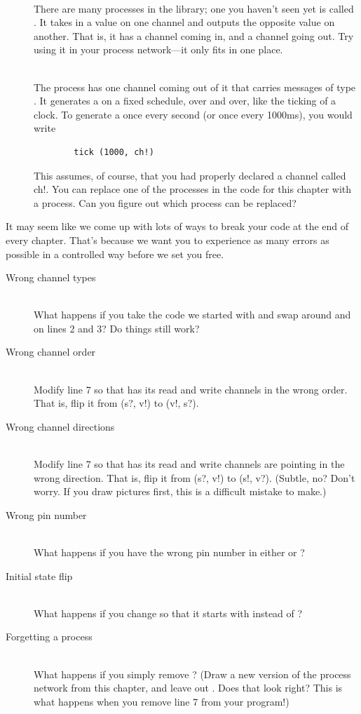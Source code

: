 \begin{description}
	\item[\il]\ \\
	There are many processes in the \plumbing library; one you haven't seen yet is called \il. It takes in a \LEVELT value on one channel and outputs the opposite value on another. That is, it has a \LEVELT channel coming in, and a \LEVELT channel going out. Try using it in your process network---it only fits in one place.
	\item[\tick]\ \\
	The \tick process has one channel coming out of it that carries messages of type \SIGNALT. It generates a \SIGNALV on a fixed schedule, over and over, like the ticking of a clock. To generate a \SIGNALV once every second (or once every 1000ms), you would write
	\begin{verbatim}
		tick (1000, ch!)
	\end{verbatim}
	This assumes, of course, that you had properly declared a channel called {\code ch!}. You can replace one of the processes in the code for this chapter with a \tick process. Can you figure out which process can be replaced?
\end{description}

\BREAKAGE
It may seem like we come up with lots of ways to break your code at the end of every chapter. That's because we want you to experience as many errors as possible in a controlled way before we set you free.

\begin{description}
	\item[Wrong channel types]\ \\
	What happens if you take the code we started with and swap around \SIGNALT and \LEVELT on lines 2 and 3? Do things still work?
	\item[Wrong channel order]\ \\
	Modify line 7 so that \toggle has its read and write channels in the wrong order. That is, flip it from {\code (s?, v!)} to {\code (v!, s?)}.
	\item[Wrong channel directions]\ \\
		Modify line 7 so that \toggle has its read and write channels are pointing in the wrong direction. That is, flip it from {\code (s?, v!)} to {\code (s!, v?)}. (Subtle, no? Don't worry. If you draw pictures first, this is a difficult mistake to make.)
  \item[Wrong pin number]\ \\
	What happens if you have the wrong pin number in either \bp or \digo?
	\item[Initial state flip]\ \\
	What happens if you change \digo so that it starts with \HIGH instead of \LOW?
	\item[Forgetting a process]\ \\
	What happens if you simply remove \toggle? (Draw a new version of the process network from this chapter, and leave out \toggle. Does that look right? This is what happens when you remove line 7 from your program!)
\end{description}	
	
	


